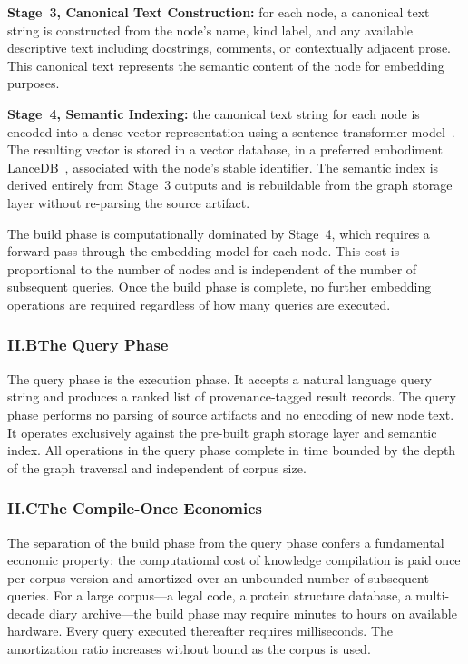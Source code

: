 \documentclass[12pt]{article}
\begin{document}
\textbf{Stage~3, Canonical Text Construction:} for each node, a canonical text
string is constructed from the node's name, kind label, and any available
descriptive text including docstrings, comments, or contextually adjacent prose.
This canonical text represents the semantic content of the node for embedding
purposes.

\textbf{Stage~4, Semantic Indexing:} the canonical text string for each node is
encoded into a dense vector representation using a sentence transformer
model~\cite{reimers2019sbert}. The resulting vector is stored in a vector
database, in a preferred embodiment LanceDB~\cite{lancedb}, associated with the
node's stable identifier. The semantic index is derived entirely from Stage~3
outputs and is rebuildable from the graph storage layer without re-parsing the
source artifact.

The build phase is computationally dominated by Stage~4, which requires a forward
pass through the embedding model for each node. This cost is proportional to the
number of nodes and is independent of the number of subsequent queries. Once the
build phase is complete, no further embedding operations are required regardless
of how many queries are executed.

\subsubsection{II.B\quad The Query Phase}

The query phase is the execution phase. It accepts a natural language query string
and produces a ranked list of provenance-tagged result records. The query phase
performs no parsing of source artifacts and no encoding of new node text. It
operates exclusively against the pre-built graph storage layer and semantic index.
All operations in the query phase complete in time bounded by the depth of the
graph traversal and independent of corpus size.

\subsubsection{II.C\quad The Compile-Once Economics}

The separation of the build phase from the query phase confers a fundamental
economic property: the computational cost of knowledge compilation is paid once
per corpus version and amortized over an unbounded number of subsequent queries.
For a large corpus---a legal code, a protein structure database, a multi-decade
diary archive---the build phase may require minutes to hours on available
hardware. Every query executed thereafter requires milliseconds. The amortization
ratio increases without bound as the corpus is used.
\end{document}
